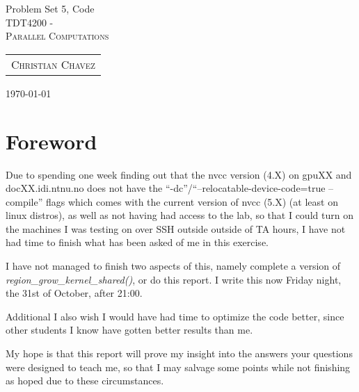 \documentclass[fontsize=11pt, paper=a4, titlepage]{article}
\begin{document}
\begin{center}

{\huge Problem Set 5, Code}\\[0.5cm]

\textsc{\LARGE TDT4200 -}\\[0.5cm]
\textsc{\large Parallel Computations}\\[1.0cm]

\begin{table}[h]
    \centering
    \begin{tabular}{c}
        \textsc{Christian Chavez}
    \end{tabular}
\end{table}

\end{center}
\vfill
\hfill \large{\today}
\clearpage

\section*{Foreword}

Due to spending one week finding out that the nvcc version (4.X) on gpuXX and
docXX.idi.ntnu.no does not have the ``-dc''/``--relocatable-device-code=true
--compile'' flags which comes with the current version of nvcc (5.X) (at least
on linux distros), as well as not having had access to the lab, so that I could
turn on the machines I was testing on over SSH outside outside of TA hours, I
have not had time to finish what has been asked of me in this exercise.

I have not managed to finish two aspects of this, namely complete a version of
\textit{region_grow_kernel_shared()}, or do this report. I write this now Friday
night, the 31st of October, after 21:00.

Additional I also wish I would have had time to optimize the code better, since
other students I know have gotten better results than me.

My hope is that this report will prove my insight into the answers your
questions were designed to teach me, so that I may salvage some points while not
finishing as hoped due to these circumstances.
\end{document}
